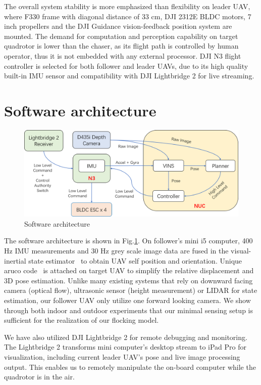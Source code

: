 The overall system stability is more emphasized than flexibility on leader UAV, where F330 frame with diagonal distance of 33 cm, DJI 2312E BLDC motors, 7 inch propellers and the DJI Guidance vision-feedback position system are mounted. The demand for computation and perception capability on target quadrotor is lower than the chaser, as its flight path is controlled by human operator, thus it is not embedded with any external processor. DJI N3 flight controller is selected for both follower and leader UAVs, due to its high quality built-in IMU sensor and compatibility with DJI Lightbridge 2 for live streaming.

\section{Software architecture}\label{software}

\begin{figure}[ht]
  \centering
  \includegraphics[width=1.0\textwidth]{figure/chapter_4/system_diagram.png}
  \caption{Software architecture}
  \label{fig:software_architecture}
\end{figure}

The software architecture is shown in Fig.\ref{fig:software_architecture}. On follower's mini i5 computer, 400 Hz IMU measurements and 30 Hz grey scale image data are fused in the visual-inertial state estimator~\cite{VINS} to obtain UAV self position and orientation. Unique aruco code~\cite{Aruco} is attached on target UAV to simplify the relative displacement and 3D pose estimation. Unlike many existing systems that rely on downward facing camera (optical flow), ultrasonic sensor (height measurement) or LIDAR for state estimation, our follower UAV only utilize one forward looking camera. We show through both indoor and outdoor experiments that our minimal sensing setup is sufficient for the realization of our flocking model.

We have also utilized DJI Lightbridge 2 for remote debugging and monitoring. The Lightbridge 2 transforms mini computer's desktop stream to iPad Pro for visualization, including current leader UAV's pose and live image processing output. This enables us to remotely manipulate the on-board computer while the quadrotor is in the air.

\newpage
